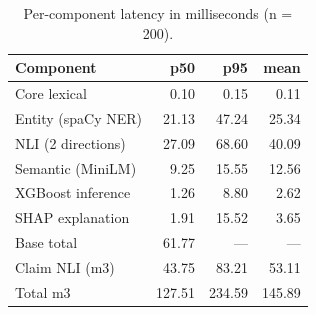 \documentclass[a4paper,fleqn]{cas-sc}
\begin{document}
\begin{table}[pos=htbp]
  \centering
  \caption{Per-component latency in milliseconds (n = 200).}
  \label{tab:latency}
  \begin{tabular}{lrrr}
    \toprule
    \textbf{Component} & \textbf{p50} & \textbf{p95} & \textbf{mean} \\
    \midrule
    Core lexical       & 0.10         & 0.15         & 0.11          \\
    Entity (spaCy NER) & 21.13        & 47.24        & 25.34         \\
    NLI (2 directions) & 27.09        & 68.60        & 40.09         \\
    Semantic (MiniLM)  & 9.25         & 15.55        & 12.56         \\
    XGBoost inference  & 1.26         & 8.80         & 2.62          \\
    SHAP explanation   & 1.91         & 15.52        & 3.65          \\
    Base total         & 61.77        & ---          & ---           \\
    Claim NLI (m3)     & 43.75        & 83.21        & 53.11         \\
    Total m3           & 127.51       & 234.59       & 145.89        \\
    \bottomrule
  \end{tabular}
\end{table}
\end{document}
